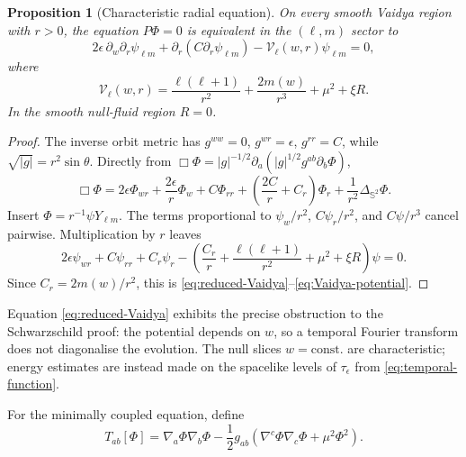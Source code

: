 \documentclass[11pt,a4paper]{article}
\newtheorem{proposition}[theorem]{Proposition}
\theoremstyle{definition}
\theoremstyle{remark}
\begin{document}
	\begin{proposition}[Characteristic radial equation]
		On every smooth Vaidya region with $r>0$, the equation $P\Phi=0$ is
		equivalent in the $(\ell,m)$ sector to
		\begin{equation}
			2\epsilon\,\partial_w\partial_r\psi_{\ell m}
			+\partial_r\!\left(C\partial_r\psi_{\ell m}\right)
			-\mathcal V_\ell(w,r)\psi_{\ell m}=0,
			\label{eq:reduced-Vaidya}
		\end{equation}
		where
		\begin{equation}
			\mathcal V_\ell(w,r)
			=\frac{\ell(\ell+1)}{r^2}+\frac{2m(w)}{r^3}+\mu^2+\xi R.
			\label{eq:Vaidya-potential}
		\end{equation}
		In the smooth null-fluid region $R=0$.
	\end{proposition}
	
	\begin{proof}
		The inverse orbit metric has
		$g^{ww}=0$, $g^{wr}=\epsilon$, $g^{rr}=C$, while
		$\sqrt{|g|}=r^2\sin\theta$.  Directly from
		$\Box\Phi=|g|^{-1/2}\partial_a(|g|^{1/2}g^{ab}\partial_b\Phi)$,
		\begin{equation}
			\Box\Phi=
			2\epsilon\Phi_{wr}+\frac{2\epsilon}{r}\Phi_w
			+C\Phi_{rr}+\left(\frac{2C}{r}+C_r\right)\Phi_r
			+\frac1{r^2}\Delta_{\mathbb S^2}\Phi.
			\label{eq:box-Vaidya}
		\end{equation}
		Insert $\Phi=r^{-1}\psi Y_{\ell m}$.  The terms proportional to
		$\psi_w/r^2$, $C\psi_r/r^2$, and $C\psi/r^3$ cancel pairwise.  Multiplication
		by $r$ leaves
		\begin{equation*}
			2\epsilon\psi_{wr}+C\psi_{rr}+C_r\psi_r
			-\left(\frac{C_r}{r}+\frac{\ell(\ell+1)}{r^2}
			+\mu^2+\xi R\right)\psi=0.
		\end{equation*}
		Since $C_r=2m(w)/r^2$, this is
		\eqref{eq:reduced-Vaidya}--\eqref{eq:Vaidya-potential}.
	\end{proof}
	
	Equation \eqref{eq:reduced-Vaidya} exhibits the precise obstruction to the
	Schwarzschild proof: the potential depends on $w$, so a temporal Fourier
	transform does not diagonalise the evolution.  The null slices $w=\mathrm
	{const.}$ are characteristic; energy estimates are instead made on the
	spacelike levels of $\tau_\epsilon$ from \eqref{eq:temporal-function}.
	
	For the minimally coupled equation, define
	\begin{equation}
		T_{ab}[\Phi]=\nabla_a\Phi\nabla_b\Phi
		-\frac12g_{ab}\left(\nabla^c\Phi\nabla_c\Phi+\mu^2\Phi^2\right).
	\end{equation}
	
\end{document}
